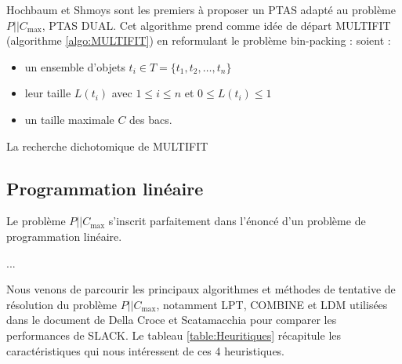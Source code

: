 \documentclass[a4paper,12pt]{report}
\theoremstyle{plain}				%
\theoremstyle{definition}				%
\newcommand\problemGrahamP{$P||C_{\max}$\xspace}
\begin{document}
Hochbaum et Shmoys sont les premiers à proposer un PTAS \cite{hochbaum1987using} 
  adapté au problème \problemGrahamP, PTAS DUAL. 
Cet algorithme prend comme idée de départ MULTIFIT (algorithme \ref{algo:MULTIFIT}) 
  en reformulant le problème bin-packing :
  soient :
\begin{itemize}
	\item un ensemble d'objets $t_i \in T=\{t_1, t_2, \ldots, t_n\}$
	\item leur taille $L(t_i)$ avec $1 \leq i \leq n$ et $0 \leq L(t_i) \leq 1$
	\item un taille maximale $C$ des bacs.
\end{itemize}    
La recherche dichotomique de MULTIFIT


\subsection{Programmation linéaire}\label{ssec:programmationLineaire}

Le problème \problemGrahamP s'inscrit parfaitement dans l'énoncé d'un problème de programmation linéaire.

...

\bigskip
Nous venons de parcourir les principaux algorithmes et méthodes de tentative de résolution du problème \problemGrahamP, 
  notamment LPT, COMBINE et LDM 
  utilisées dans le document de Della Croce et Scatamacchia \cite{della2020longest} 
  pour comparer les performances de SLACK. 
Le tableau \ref{table:Heuritiques} récapitule les caractéristiques qui nous intéressent 
  de ces 4 heuristiques.
\end{document}
